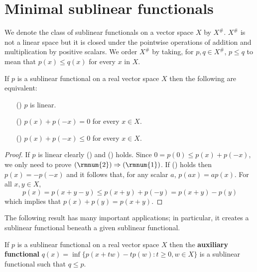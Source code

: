 \section{Minimal sublinear functionals}
We denote the class of sublinear functionals on a vector space $X$ by $X^{\#}$. $X^{\#}$ is not a linear space but it is closed under the pointwise operations of addition and multiplication by positive scalars. We order $X^{\#}$ by taking, for $p,q\in X^{\#}$, $p\leq q$ to mean that $p(x)\leq q(x)$ for every $x$ in $X$.
\begin{proposition}\label{sublinear is linear iff p(-x)+p(x)=0}
If $p$ is a sublinear functional on a real vector space $X$ then the following are equivalent:
\begin{itemize}
\item[(\rmnum{1})] $p$ is linear.
\item[(\rmnum{2})] $p(x)+p(-x)=0$ for every $x\in X$.
\item[(\rmnum{3})] $p(x)+p(-x)\leq 0$ for every $x\in X$.
\end{itemize}
\end{proposition}
\begin{proof}
If $p$ is linear clearly () and () holds. Since $0=p(0)\leq p(x)+p(-x)$, we only need to prove $(\rmnum{2})\Rightarrow(\rmnum{1})$. If () holds then $p(x)=-p(-x)$ and it follows that, for any scalar $a$, $p(ax)=ap(x)$. For all $x,y\in X$,
\[p(x)=p(x+y-y)\leq p(x+y)+p(-y)=p(x+y)-p(y)\]
which implies that $p(x)+p(y)=p(x+y)$.
\end{proof}
The following result has many important applications; in particular, it creates a sublinear functional beneath a given sublinear functional.
\begin{proposition}\label{sublinear functional beneath}
If $p$ is a sublinear functional on a real vector space $X$ then the \textbf{auxiliary functional} $q(x)=\inf\{p(x+tw)-tp(w):t\geq 0,w\in X\}$ is a sublinear functional such that $q\leq p$.
\end{proposition}
